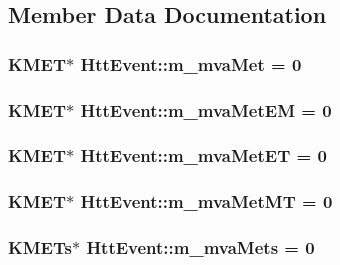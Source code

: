 \subsection{Member Data Documentation}
\hypertarget{classHttEvent_a960094fe213f6d23d0b4579f0843551d}{
\subsubsection[{m\_\-mvaMet}]{\setlength{\rightskip}{0pt plus 5cm}KMET$\ast$ {\bf HttEvent::m\_\-mvaMet} = 0}}
\label{classHttEvent_a960094fe213f6d23d0b4579f0843551d}
\hypertarget{classHttEvent_a34ce25e1c99be89510a591d80b159e87}{
\subsubsection[{m\_\-mvaMetEM}]{\setlength{\rightskip}{0pt plus 5cm}KMET$\ast$ {\bf HttEvent::m\_\-mvaMetEM} = 0}}
\label{classHttEvent_a34ce25e1c99be89510a591d80b159e87}
\hypertarget{classHttEvent_ae89b1c18197efcd1ab75566d6ba04f49}{
\subsubsection[{m\_\-mvaMetET}]{\setlength{\rightskip}{0pt plus 5cm}KMET$\ast$ {\bf HttEvent::m\_\-mvaMetET} = 0}}
\label{classHttEvent_ae89b1c18197efcd1ab75566d6ba04f49}
\hypertarget{classHttEvent_a28fc6af14c812f81468a843344c40384}{
\subsubsection[{m\_\-mvaMetMT}]{\setlength{\rightskip}{0pt plus 5cm}KMET$\ast$ {\bf HttEvent::m\_\-mvaMetMT} = 0}}
\label{classHttEvent_a28fc6af14c812f81468a843344c40384}
\hypertarget{classHttEvent_a325b2774a25fd9898dd4ed29dae04871}{
\subsubsection[{m\_\-mvaMets}]{\setlength{\rightskip}{0pt plus 5cm}KMETs$\ast$ {\bf HttEvent::m\_\-mvaMets} = 0}}
